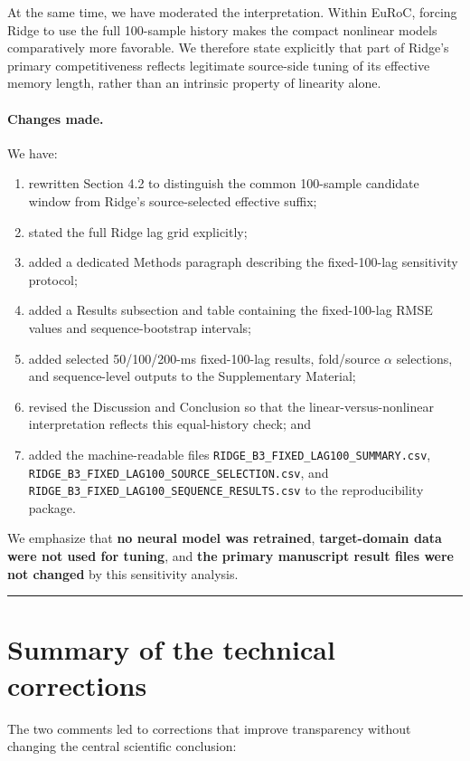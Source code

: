 \documentclass[12pt,a4paper]{article}
\begin{document}
At the same time, we have moderated the interpretation. Within EuRoC, forcing Ridge to use the full 100-sample history makes the compact nonlinear models comparatively more favorable. We therefore state explicitly that part of Ridge's primary competitiveness reflects legitimate source-side tuning of its effective memory length, rather than an intrinsic property of linearity alone.

\paragraph{Changes made.}
We have:
\begin{enumerate}[leftmargin=*]
    \item rewritten Section 4.2 to distinguish the common 100-sample candidate window from Ridge's source-selected effective suffix;
    \item stated the full Ridge lag grid explicitly;
    \item added a dedicated Methods paragraph describing the fixed-100-lag sensitivity protocol;
    \item added a Results subsection and table containing the fixed-100-lag RMSE values and sequence-bootstrap intervals;
    \item added selected 50/100/200-ms fixed-100-lag results, fold/source $\alpha$ selections, and sequence-level outputs to the Supplementary Material;
    \item revised the Discussion and Conclusion so that the linear-versus-nonlinear interpretation reflects this equal-history check; and
    \item added the machine-readable files
    \texttt{RIDGE\_B3\_FIXED\_LAG100\_SUMMARY.csv},
    \texttt{RIDGE\_B3\_FIXED\_LAG100\_SOURCE\_SELECTION.csv}, and
    \texttt{RIDGE\_B3\_FIXED\_LAG100\_SEQUENCE\_RESULTS.csv}
    to the reproducibility package.
\end{enumerate}

We emphasize that \textbf{no neural model was retrained}, \textbf{target-domain data were not used for tuning}, and \textbf{the primary manuscript result files were not changed} by this sensitivity analysis.

\bigskip
\hrule
\bigskip

\section*{Summary of the technical corrections}

The two comments led to corrections that improve transparency without changing the central scientific conclusion:
\end{document}
